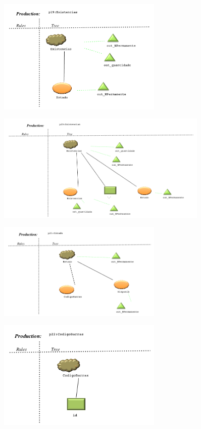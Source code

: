 \begin{figure}[!htb]
  \centering
    \includegraphics[width=0.7\textwidth]{./imagens/VisualLisa/__p19_Existencias.png}
\end{figure}
\begin{figure}[!htb]
  \centering
    \includegraphics[width=0.9\textwidth]{./imagens/VisualLisa/__p20_Existencias.png}
\end{figure}
\clearpage
\begin{figure}[!htb]
  \centering
    \includegraphics[width=0.7\textwidth]{./imagens/VisualLisa/__p21_Estado.png}
\end{figure}
\begin{figure}[!htb]
  \centering
    \includegraphics[width=0.7\textwidth]{./imagens/VisualLisa/__p22_CodigoBarras.png}
\end{figure}
